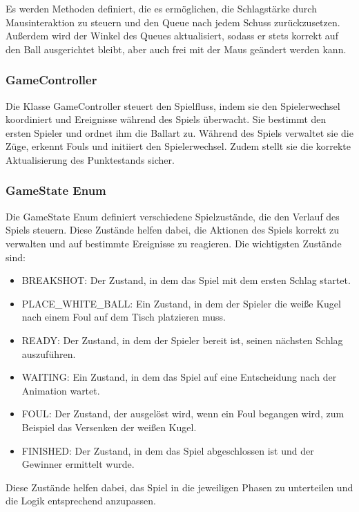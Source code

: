 \documentclass[a4paper,12pt]{article}
\begin{document}
	Es werden Methoden definiert, die es ermöglichen, die Schlagstärke durch Mausinteraktion zu steuern und den Queue nach jedem Schuss zurückzusetzen. Außerdem wird der Winkel des Queues aktualisiert, sodass er stets korrekt auf den Ball ausgerichtet bleibt, aber auch frei mit der Maus geändert werden kann.
	
	
\subsubsection{GameController}

Die Klasse GameController steuert den Spielfluss, indem sie den Spielerwechsel koordiniert und Ereignisse während des Spiels überwacht. Sie bestimmt den ersten Spieler und ordnet ihm die Ballart zu. Während des Spiels verwaltet sie die Züge, erkennt Fouls und initiiert den Spielerwechsel. Zudem stellt sie die korrekte Aktualisierung des Punktestands sicher. 
	
	
	
	\subsubsection{GameState Enum}
	Die GameState Enum definiert verschiedene Spielzustände, die den Verlauf des Spiels steuern. Diese Zustände helfen dabei, die Aktionen des Spiels korrekt zu verwalten und auf bestimmte Ereignisse zu reagieren. Die wichtigsten Zustände sind:
	
	\begin{itemize}
		\item BREAKSHOT: Der Zustand, in dem das Spiel mit dem ersten Schlag startet.
		\item PLACE\_WHITE\_BALL: Ein Zustand, in dem der Spieler die weiße Kugel nach einem Foul auf dem Tisch platzieren muss.
		\item READY: Der Zustand, in dem der Spieler bereit ist, seinen nächsten Schlag auszuführen.
		\item WAITING: Ein Zustand, in dem das Spiel auf eine Entscheidung nach der Animation wartet.
		\item FOUL: Der Zustand, der ausgelöst wird, wenn ein Foul begangen wird, zum Beispiel das Versenken der weißen Kugel.
		\item FINISHED: Der Zustand, in dem das Spiel abgeschlossen ist und der Gewinner ermittelt wurde.
	\end{itemize}
	
	Diese Zustände helfen dabei, das Spiel in die jeweiligen Phasen zu unterteilen und die Logik entsprechend anzupassen.
	
\end{document}
